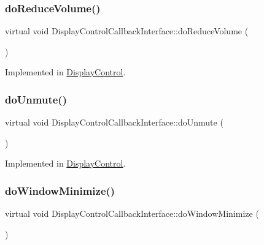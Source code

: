 \subsubsection{\texorpdfstring{do\+Reduce\+Volume()}{doReduceVolume()}}
{\footnotesize\ttfamily virtual void Display\+Control\+Callback\+Interface\+::do\+Reduce\+Volume (\begin{DoxyParamCaption}{ }\end{DoxyParamCaption})\hspace{0.3cm}{\ttfamily [pure virtual]}}



Implemented in \hyperlink{classDisplayControl_a874fa3f6b3e4cf465db62a4eba1c1dd1}{Display\+Control}.

\mbox{\label{classDisplayControlCallbackInterface_a24be31ca23631717ac789f2e98467015}} 
\subsubsection{\texorpdfstring{do\+Unmute()}{doUnmute()}}
{\footnotesize\ttfamily virtual void Display\+Control\+Callback\+Interface\+::do\+Unmute (\begin{DoxyParamCaption}{ }\end{DoxyParamCaption})\hspace{0.3cm}{\ttfamily [pure virtual]}}



Implemented in \hyperlink{classDisplayControl_a210411b559d8c3ffb1498f49cfa26a6d}{Display\+Control}.

\mbox{\label{classDisplayControlCallbackInterface_a5457bccb953df7296b81b96db827896c}} 
\subsubsection{\texorpdfstring{do\+Window\+Minimize()}{doWindowMinimize()}}
{\footnotesize\ttfamily virtual void Display\+Control\+Callback\+Interface\+::do\+Window\+Minimize (\begin{DoxyParamCaption}{ }\end{DoxyParamCaption})\hspace{0.3cm}{\ttfamily [pure virtual]}}



